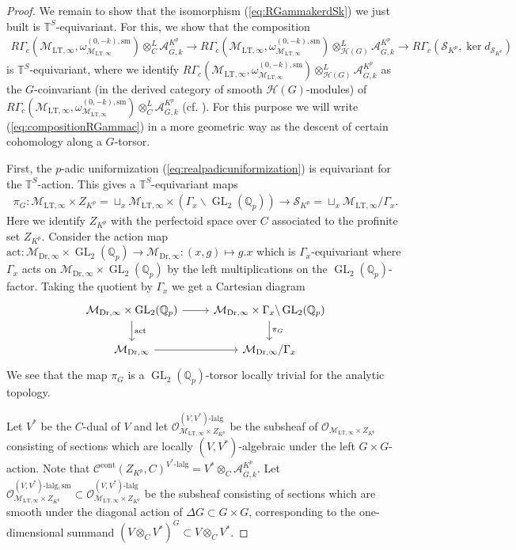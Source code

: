 \documentclass{article}
\theoremstyle{definition}
\def\calA{\mathcal{A}}
\def\calC{\mathcal{C}}
\def\calH{\mathcal{H}}
\def\calM{\mathcal{M}}
\def\calO{\mathcal{O}}
\def\calS{\mathcal{S}}
\def\bbQ{\mathbb{Q}}
\def\bbT{\mathbb{T}}
\DeclareMathOperator{\ox}{\otimes}
\DeclareMathOperator{\GL}{GL}
\DeclareMathOperator{\cont}{cont}
\def\LT{\mathrm{LT}}
\def\sm{\mathrm{sm}}
\def\lalg{\mathrm{lalg}}
\def\bar{\overline}
\def\-{\text{-}}
\def\-{\text{-}}
\def\Dr{\mathrm{Dr}}
\begin{document}
\begin{proof}
    We remain to show that the isomorphism (\ref{eq:RGammakerdSk}) we just built is $\bbT^S$-equivariant. For this, we show that the composition
    \begin{align}\label{eq:compositionRGammac}
         R\Gamma_c(\calM_{\LT,\infty},\omega_{\calM_{\LT,\infty}}^{(0,-k),\sm})\ox_{C}^L\calA^{K^p}_{\bar G,k}\to R\Gamma_c(\calM_{\LT,\infty},\omega_{\calM_{\LT,\infty}}^{(0,-k),\sm})\ox_{\calH(G)}^L\calA^{K^p}_{\bar G,k}\rightarrow R\Gamma_c(\calS_{K^p},\ker d_{\calS _{K^p}})
    \end{align} 
    is $\bbT^S$-equivariant, where we identify $R\Gamma_c(\calM_{\LT,\infty},\omega_{\calM_{\LT,\infty}}^{(0,-k),\sm})\ox_{\calH(G)}^L\calA^{K^p}_{\bar G,k}$ as the $G$-coinvariant (in the derived category of smooth $\calH(G)$-modules) of $R\Gamma_c(\calM_{\LT,\infty},\omega_{\calM_{\LT,\infty}}^{(0,-k),\sm})\ox_{C}^L\calA^{K^p}_{\bar G,k}$ (cf. \cite[(III.1.15.1)]{renard2010representations}). For this purpose we will write (\ref{eq:compositionRGammac}) in a more geometric way as the descent of certain cohomology along a $G$-torsor.

    First, the $p$-adic uniformization (\ref{eq:realpadicuniformization}) is equivariant for the $\bbT^S$-action. This gives a $\bbT^S$-equivariant maps 
    \begin{align*}
        \pi_{G}:\calM_{\LT,\infty}\times Z_{K^p}=\sqcup_{x} \calM_{\LT,\infty}\times(\Gamma_x\backslash \GL_2(\bbQ_p))\rightarrow \calS_{K^p}=\sqcup_{x} \calM_{\LT,\infty}/\Gamma_x.
    \end{align*}
    Here we identify $Z_{K^p}$ with the perfectoid space over $C$ associated to the profinite set $Z_{K^p}$. Consider the action map $\mathrm{act}:\calM_{\Dr,\infty}\times\GL_2(\bbQ_p)\rightarrow \calM_{\Dr,\infty}:(x,g)\mapsto g.x$ which is $\Gamma_x$-equivariant where $\Gamma_x$ acts on $\calM_{\Dr,\infty}\times\GL_2(\bbQ_p)$ by the left multiplications on the $\GL_2(\bbQ_p)$-factor. Taking the quotient by $\Gamma_x$ we get a Cartesian diagram
    \[\begin{tikzcd}
        \calM_{\Dr,\infty}\times \GL_2(\bbQ_p)\arrow[r]\arrow[d,"\mathrm{act}"]&\calM_{\Dr,\infty}\times \Gamma_x\backslash\GL_2(\bbQ_p)\arrow[d,"\pi_G"]  \\
        \calM_{\Dr,\infty}\arrow[r]&\calM_{\Dr,\infty}/\Gamma_x 
    \end{tikzcd}\] 
    We see that the map $\pi_G$ is a $\GL_2(\bbQ_p)$-torsor locally trivial for the analytic topology.
    
    Let $V^*$ be the $C$-dual of $V$ and let $\calO_{\calM_{\LT,\infty}\times Z_{K^p}}^{(V,V^*)\-\lalg}$ be the subsheaf of $\calO_{\calM_{\LT,\infty}\times Z_{K^p}}$ consisting of sections which are locally $(V,V^*)$-algebraic under the left $G\times G$-action. Note that $\calC^{\cont}(Z_{K^p},C)^{V^*\-\lalg}=V^*\otimes_C\calA^{K^p}_{\bar G,k}$. Let $\calO_{\calM_{\LT,\infty}\times Z_{K^p}}^{(V,V^*)\-\lalg,\sm}\subset \calO_{\calM_{\LT,\infty}\times Z_{K^p}}^{(V,V^*)\-\lalg}$ be the subsheaf consisting of sections which are smooth under the diagonal action of $\Delta G\subset G\times G$, corresponding to the one-dimensional summand $(V\otimes_C V^*)^G\subset V\otimes_C V^*$. 


\end{proof}
\end{document}
